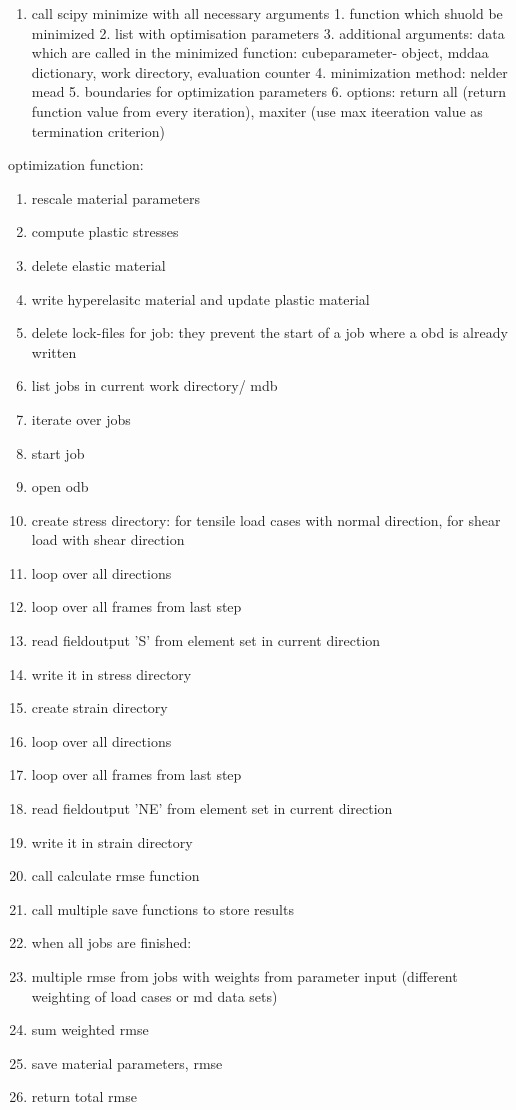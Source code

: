     \begin{enumerate}
        \item call scipy minimize with all necessary arguments
            1. function which shuold be minimized
            2. list with optimisation parameters
            3. additional arguments: data which are called in the minimized function:
                cubeparameter- object, mddaa dictionary, work directory, evaluation counter
            4. minimization method: nelder mead
            5. boundaries for optimization parameters
            6. options: return all (return function value from every iteration), maxiter (use max iteeration value as termination criterion)
    \end{enumerate}

    optimization function:
    \begin{enumerate}
        \item rescale material parameters
        \item compute plastic stresses
        \item delete elastic material
        \item write hyperelasitc material and update plastic material
        \item delete lock-files for job: they prevent the start of a job where a obd is already written
        \item list jobs in current work directory/ mdb
        \item iterate over jobs
        \item start job
        \item open odb
        \item create stress directory: for tensile load cases with normal direction, for shear load with shear direction
        \item loop over all directions
        \item loop over all frames from last step
        \item read fieldoutput 'S' from element set in current direction 
        \item write it in stress directory
        \item create strain directory
        \item loop over all directions
        \item loop over all frames from last step
        \item read fieldoutput 'NE' from element set in current direction 
        \item write it in strain directory
        \item call calculate rmse function
        \item call multiple save functions to store results
        \item when all jobs are finished: 
        \item multiple rmse from jobs with weights from parameter input (different weighting of load cases or md data sets)
        \item sum weighted rmse 
        \item save material parameters, rmse
        \item return total rmse


\end{enumerate}
